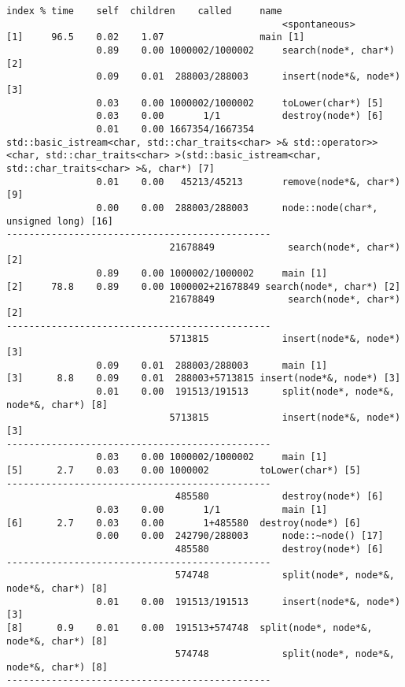 \documentclass[12pt]{article}
\begin{document}
\begin{verbatim}
index % time    self  children    called     name
                                                 <spontaneous>
[1]     96.5    0.02    1.07                 main [1]
                0.89    0.00 1000002/1000002     search(node*, char*) [2]
                0.09    0.01  288003/288003      insert(node*&, node*) [3]
                0.03    0.00 1000002/1000002     toLower(char*) [5]
                0.03    0.00       1/1           destroy(node*) [6]
                0.01    0.00 1667354/1667354     std::basic_istream<char, std::char_traits<char> >& std::operator>><char, std::char_traits<char> >(std::basic_istream<char, std::char_traits<char> >&, char*) [7]
                0.01    0.00   45213/45213       remove(node*&, char*) [9]
                0.00    0.00  288003/288003      node::node(char*, unsigned long) [16]
-----------------------------------------------
                             21678849             search(node*, char*) [2]
                0.89    0.00 1000002/1000002     main [1]
[2]     78.8    0.89    0.00 1000002+21678849 search(node*, char*) [2]
                             21678849             search(node*, char*) [2]
-----------------------------------------------
                             5713815             insert(node*&, node*) [3]
                0.09    0.01  288003/288003      main [1]
[3]      8.8    0.09    0.01  288003+5713815 insert(node*&, node*) [3]
                0.01    0.00  191513/191513      split(node*, node*&, node*&, char*) [8]
                             5713815             insert(node*&, node*) [3]
-----------------------------------------------
                0.03    0.00 1000002/1000002     main [1]
[5]      2.7    0.03    0.00 1000002         toLower(char*) [5]
-----------------------------------------------
                              485580             destroy(node*) [6]
                0.03    0.00       1/1           main [1]
[6]      2.7    0.03    0.00       1+485580  destroy(node*) [6]
                0.00    0.00  242790/288003      node::~node() [17]
                              485580             destroy(node*) [6]
-----------------------------------------------
                              574748             split(node*, node*&, node*&, char*) [8]
                0.01    0.00  191513/191513      insert(node*&, node*) [3]
[8]      0.9    0.01    0.00  191513+574748  split(node*, node*&, node*&, char*) [8]
                              574748             split(node*, node*&, node*&, char*) [8]
-----------------------------------------------

\end{verbatim}
\end{document}
